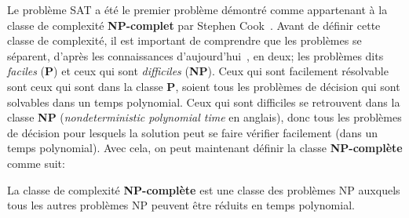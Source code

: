 Le problème SAT a été le premier problème démontré comme appartenant à la classe de complexité \textbf{NP-complet} par Stephen Cook~\cite{cook1971}.
Avant de définir cette classe de complexité, il est important de comprendre que les problèmes se séparent, d'après les connaissances d'aujourd'hui~\cite{millenniumPrizeProblems}, en deux; les problèmes dits \emph{faciles} (\textbf{P}) et ceux qui sont \emph{difficiles} (\textbf{NP}).
Ceux qui sont facilement résolvable sont ceux qui sont dans la classe \textbf{P}, soient tous les problèmes de décision qui sont solvables dans un temps polynomial.
Ceux qui sont difficiles se retrouvent dans la classe \textbf{NP} (\textit{nondeterministic polynomial time} en anglais), donc tous les problèmes de décision pour lesquels la solution peut se faire vérifier facilement (dans un temps polynomial).
Avec cela, on peut maintenant définir la classe \textbf{NP-complète} comme suit:
\begin{definition}\label{def:NP-complete}
    La classe de complexité \textbf{NP-complète} est une classe des problèmes NP auxquels tous les autres problèmes NP peuvent être réduits en temps polynomial.
\end{definition}
